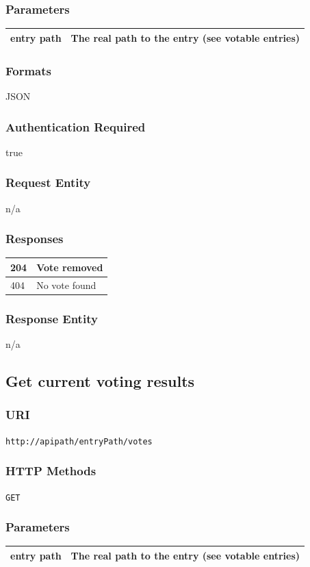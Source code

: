 \documentclass[10pt]{article}
\begin{document}
\subsubsection{Parameters}
\begin{tabular}{|l|l|}\hline
entry path & The real path to the entry (see votable entries) \\
\hline
\end{tabular}
\subsubsection{Formats}
JSON
\subsubsection{Authentication Required}
true
\subsubsection{Request Entity}
n/a
\subsubsection{Responses}
\begin{tabular}{|l|l|}\hline
204 & Vote removed \\
\hline
404 & No vote found \\
\hline
\end{tabular}
\subsubsection{Response Entity}
n/a
\subsection{Get current voting results}
\subsubsection{URI}
\texttt{http://apipath/entryPath/votes
}\subsubsection{HTTP Methods}
\texttt{GET}
\subsubsection{Parameters}
\begin{tabular}{|l|l|}\hline
entry path & The real path to the entry (see votable entries) \\
\hline
\end{tabular}
\end{document}
